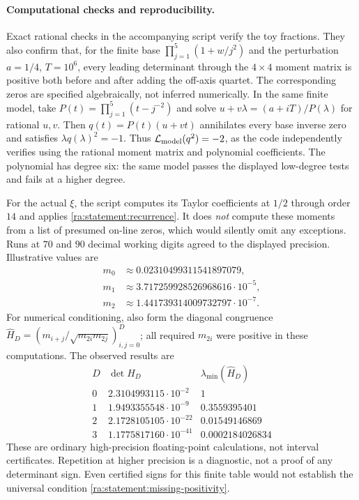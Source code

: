 \documentclass[11pt]{article}
\begin{document}
\paragraph{Computational checks and reproducibility.}
Exact rational checks in the accompanying script verify the toy fractions.
They also confirm that, for the
finite base $\prod_{j=1}^5(1+w/j^2)$ and the perturbation
$a=1/4$, $T=10^6$, every leading determinant through the $4\times4$ moment
matrix is positive both before and after adding the off-axis quartet.
The corresponding zeros are specified algebraically, not inferred numerically.
In the same finite model, take
$P(t)=\prod_{j=1}^5(t-j^{-2})$ and solve
$u+v\lambda=(a+iT)/P(\lambda)$ for rational $u,v$.
Then $q(t)=P(t)(u+vt)$ annihilates every base inverse zero and satisfies
$\lambda q(\lambda)^2=-1$. Thus
$\mathcal L_{\rm model}(q^2)=-2$, as the code independently verifies using
the rational moment matrix and polynomial coefficients. The polynomial has
degree six: the same model passes the displayed low-degree tests and fails
at a higher degree.

For the actual $\xi$, the script computes its Taylor coefficients at $1/2$
through order $14$ and applies \eqref{ra:statement:recurrence}. It does \emph{not}
compute these moments from a list of presumed on-line zeros, which would
silently omit any exceptions. Runs at $70$ and $90$ decimal working digits
agreed to the displayed precision. Illustrative values are
\[
 \begin{aligned}
 m_0&\approx0.02310499311541897079,\\
 m_1&\approx3.717259928526968616\cdot10^{-5},\\
 m_2&\approx1.441739314009732797\cdot10^{-7}.
 \end{aligned}
\]
For numerical conditioning, also form the diagonal congruence
$\widehat H_D=(m_{i+j}/\sqrt{m_{2i}m_{2j}})_{i,j=0}^D$; all required
$m_{2i}$ were positive in these computations. The observed results are
\[
\begin{array}{c|c|c}
 D&\det H_D&\lambda_{\min}(\widehat H_D)\\ \hline
 0&2.3104993115\cdot10^{-2}&1\\
 1&1.9493355548\cdot10^{-9}&0.3559395401\\
 2&2.1728105105\cdot10^{-22}&0.01549146869\\
 3&1.1775817160\cdot10^{-41}&0.0002184026834
\end{array}
\]
These are ordinary high-precision floating-point calculations, not interval
certificates. Repetition at higher precision is a diagnostic, not a proof of
any determinant sign. Even certified signs for this finite table would not
establish the universal condition \eqref{ra:statement:missing-positivity}.
\end{document}
